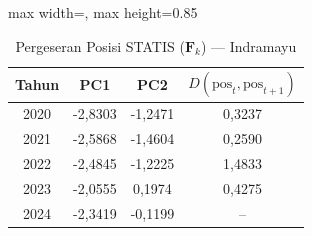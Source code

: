 \begin{table}[H]
\centering
\caption{Pergeseran Posisi STATIS ($\mathbf{F}_k$) --- Indramayu} \label{tab:app2jarak_statis_skor_indramayu}
\begin{adjustbox}{max width=\textwidth, max height=0.85\textheight}
\begin{tabular}{|c|c|c|c|}
\hline
\textbf{Tahun} & \textbf{PC1} & \textbf{PC2} & \textbf{$D(\text{pos}_t, \text{pos}_{t+1})$} \\
\hline
2020 & -2,8303 & -1,2471 & 0,3237 \\
2021 & -2,5868 & -1,4604 & 0,2590 \\
2022 & -2,4845 & -1,2225 & 1,4833 \\
2023 & -2,0555 & 0,1974 & 0,4275 \\
2024 & -2,3419 & -0,1199 & -- \\
\hline
\end{tabular}
\end{adjustbox}
\end{table}